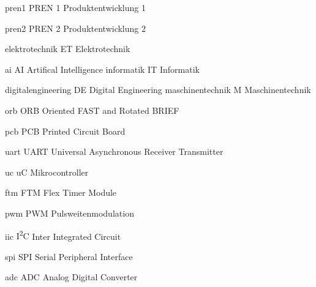 \newacronym
  {pren1}                 %
  {PREN 1}                %
  {Produktentwicklung 1}  %

\newacronym
  {pren2}                 %
  {PREN 2}                %
  {Produktentwicklung 2}  %

\newacronym
  {elektrotechnik}                    %
  {ET}                    %
  {Elektrotechnik}        %

\newacronym
  {ai}                    %
  {AI}                    %
  {Artifical Intelligence}%
\newacronym
  {informatik}              %
  {IT}                      %
  {Informatik}   
  
\newacronym
  {digitalengineering}             %
  {DE}                      %
  {Digital Engineering}  
\newacronym
  {maschinentechnik}       %
  {M}                      %
  {Maschinentechnik}       %

\newacronym
  {orb}                                    %
  {ORB}                                    %
  {Oriented FAST and Rotated BRIEF}        %

\newacronym
  {pcb}                         %
  {PCB}                         %
  {Printed Circuit Board}       %

\newacronym
  {uart}       %
  {UART}                      %
  {Universal Asynchronous Receiver Transmitter}       %

\newacronym
  {uc}       %
  {uC}                      %
  {Mikrocontroller}       %

\newacronym
  {ftm}       %
  {FTM}                      %
  {Flex Timer Module}       %

\newacronym
  {pwm}                 %
  {PWM}                %
  {Pulsweitenmodulation}  %

\newacronym
  {iic}                 %
  {I\textsuperscript{2}C}     %
  {Inter Integrated Circuit}  %


\newacronym
  {spi}                 %
  {SPI}                %
  {Serial Peripheral Interface}  %

\newacronym
  {adc}                 %
  {ADC}                %
  {Analog Digital Converter}  %

